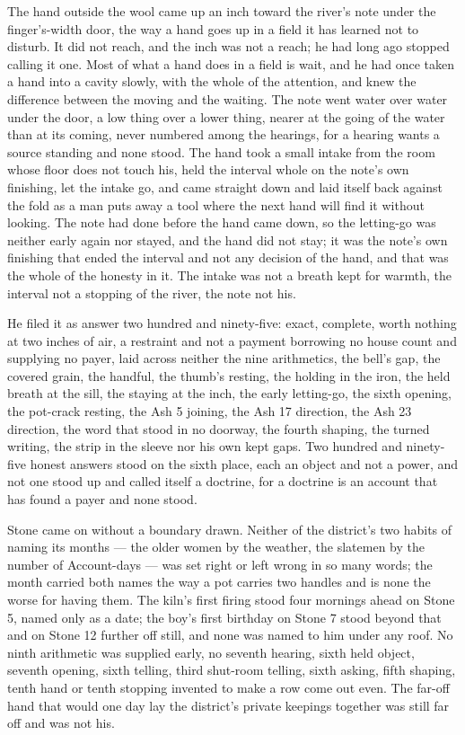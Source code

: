 The hand outside the wool came up an inch toward the river's note under the finger's-width door, the way a hand goes up in a field it has learned not to disturb. It did not reach, and the inch was not a reach; he had long ago stopped calling it one. Most of what a hand does in a field is wait, and he had once taken a hand into a cavity slowly, with the whole of the attention, and knew the difference between the moving and the waiting. The note went water over water under the door, a low thing over a lower thing, nearer at the going of the water than at its coming, never numbered among the hearings, for a hearing wants a source standing and none stood. The hand took a small intake from the room whose floor does not touch his, held the interval whole on the note's own finishing, let the intake go, and came straight down and laid itself back against the fold as a man puts away a tool where the next hand will find it without looking. The note had done before the hand came down, so the letting-go was neither early again nor stayed, and the hand did not stay; it was the note's own finishing that ended the interval and not any decision of the hand, and that was the whole of the honesty in it. The intake was not a breath kept for warmth, the interval not a stopping of the river, the note not his.

He filed it as answer two hundred and ninety-five: exact, complete, worth nothing at two inches of air, a restraint and not a payment borrowing no house count and supplying no payer, laid across neither the nine arithmetics, the bell's gap, the covered grain, the handful, the thumb's resting, the holding in the iron, the held breath at the sill, the staying at the inch, the early letting-go, the sixth opening, the pot-crack resting, the Ash 5 joining, the Ash 17 direction, the Ash 23 direction, the word that stood in no doorway, the fourth shaping, the turned writing, the strip in the sleeve nor his own kept gaps. Two hundred and ninety-five honest answers stood on the sixth place, each an object and not a power, and not one stood up and called itself a doctrine, for a doctrine is an account that has found a payer and none stood.

Stone came on without a boundary drawn. Neither of the district's two habits of naming its months --- the older women by the weather, the slatemen by the number of Account-days --- was set right or left wrong in so many words; the month carried both names the way a pot carries two handles and is none the worse for having them. The kiln's first firing stood four mornings ahead on Stone 5, named only as a date; the boy's first birthday on Stone 7 stood beyond that and  on Stone 12 further off still, and none was named to him under any roof. No ninth arithmetic was supplied early, no seventh hearing, sixth held object, seventh opening, sixth telling, third shut-room telling, sixth asking, fifth shaping, tenth hand or tenth stopping invented to make a row come out even. The far-off hand that would one day lay the district's private keepings together was still far off and was not his.

